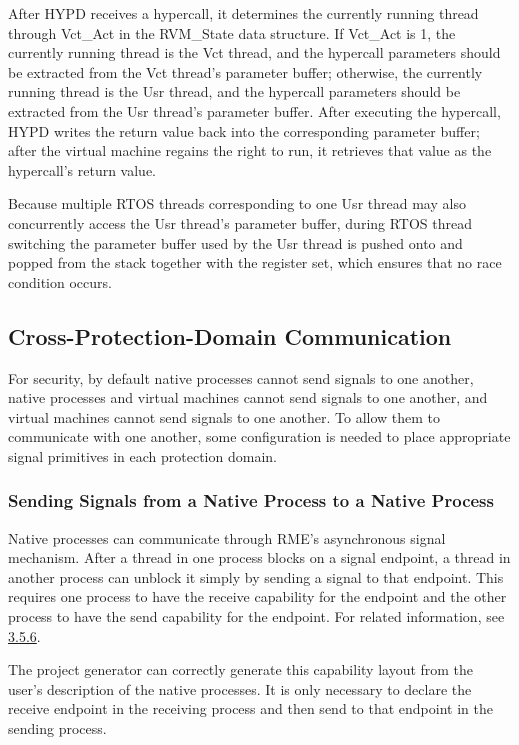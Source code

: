 After HYPD receives a hypercall, it determines the currently running thread through Vct\_Act in the RVM\_State data structure. If Vct\_Act is 1, the currently running thread is the Vct thread, and the hypercall parameters should be extracted from the Vct thread's parameter buffer; otherwise, the currently running thread is the Usr thread, and the hypercall parameters should be extracted from the Usr thread's parameter buffer. After executing the hypercall, HYPD writes the return value back into the corresponding parameter buffer; after the virtual machine regains the right to run, it retrieves that value as the hypercall's return value.

Because multiple RTOS threads corresponding to one Usr thread may also concurrently access the Usr thread's parameter buffer, during RTOS thread switching the parameter buffer used by the Usr thread is pushed onto and popped from the stack together with the register set, which ensures that no race condition occurs.

\subsection{Cross-Protection-Domain Communication}\label{subsec:2-2-7}

For security, by default native processes cannot send signals to one another, native processes and virtual machines cannot send signals to one another, and virtual machines cannot send signals to one another. To allow them to communicate with one another, some configuration is needed to place appropriate signal primitives in each protection domain.

\subsubsection{Sending Signals from a Native Process to a Native Process}\label{subsubsec:2-2-7-1}

Native processes can communicate through RME's asynchronous signal mechanism. After a thread in one process blocks on a signal endpoint, a thread in another process can unblock it simply by sending a signal to that endpoint. This requires one process to have the receive capability for the endpoint and the other process to have the send capability for the endpoint. For related information, see \protect\hyperref[subsec:3-5-6]{3.5.6}.

The project generator can correctly generate this capability layout from the user's description of the native processes. It is only necessary to declare the receive endpoint in the receiving process and then send to that endpoint in the sending process.

